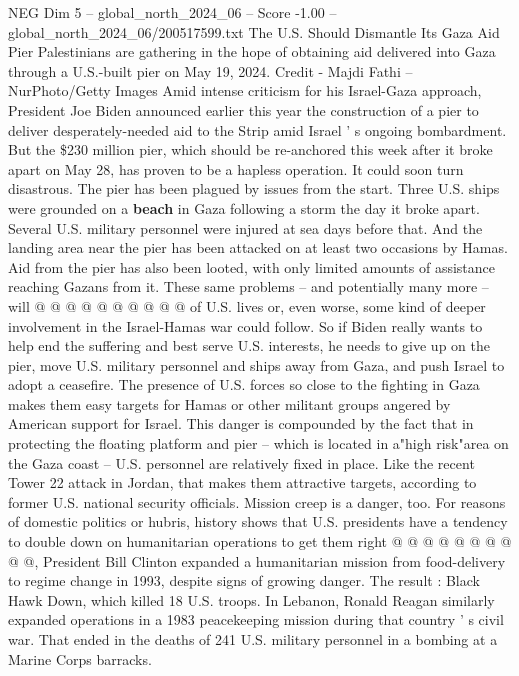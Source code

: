 \begin{textsample}{NEG Dim 5 – global\_north\_2024\_06 – Score -1.00 – global\_north\_2024\_06/200517599.txt}  \label{ex:f5_neg_085}
The U.S.
Should Dismantle Its Gaza Aid Pier Palestinians are gathering in the hope of obtaining aid delivered into Gaza through a U.S.-built pier on May 19, 2024.
Credit - Majdi Fathi -- NurPhoto/Getty Images Amid intense criticism for his Israel-Gaza approach, President Joe Biden announced earlier this year the construction of a pier to deliver desperately-needed aid to the Strip amid Israel ' s ongoing bombardment.
But the \$230 million pier, which should be re-anchored this week after it broke apart on May 28, has proven to be a hapless operation.
It could soon turn disastrous.
The pier has been plagued by issues from the start.
Three U.S. ships were grounded on a \textbf{beach} in Gaza following a storm the day it broke apart.
Several U.S. military personnel were injured at sea days before that.
And the landing area near the pier has been attacked on at least two occasions by Hamas.
Aid from the pier has also been looted, with only limited amounts of assistance reaching Gazans from it.
These same problems -- and potentially many more -- will @ @ @ @ @ @ @ @ @ @ of U.S. lives or, even worse, some kind of deeper involvement in the Israel-Hamas war could follow.
So if Biden really wants to help end the suffering and best serve U.S. interests, he needs to give up on the pier, move U.S. military personnel and ships away from Gaza, and push Israel to adopt a ceasefire.
The presence of U.S. forces so close to the fighting in Gaza makes them easy targets for Hamas or other militant groups angered by American support for Israel.
This danger is compounded by the fact that in protecting the floating platform and pier -- which is located in a"high risk"area on the Gaza coast -- U.S. personnel are relatively fixed in place.
Like the recent Tower 22 attack in Jordan, that makes them attractive targets, according to former U.S. national security officials.
Mission creep is a danger, too.
For reasons of domestic politics or hubris, history shows that U.S. presidents have a tendency to double down on humanitarian operations to get them right @ @ @ @ @ @ @ @ @ @, President Bill Clinton expanded a humanitarian mission from food-delivery to regime change in 1993, despite signs of growing danger.
The result : Black Hawk Down, which killed 18 U.S. troops.
In Lebanon, Ronald Reagan similarly expanded operations in a 1983 peacekeeping mission during that country ' s civil war.
That ended in the deaths of 241 U.S. military personnel in a bombing at a Marine Corps barracks.

\end{textsample}
